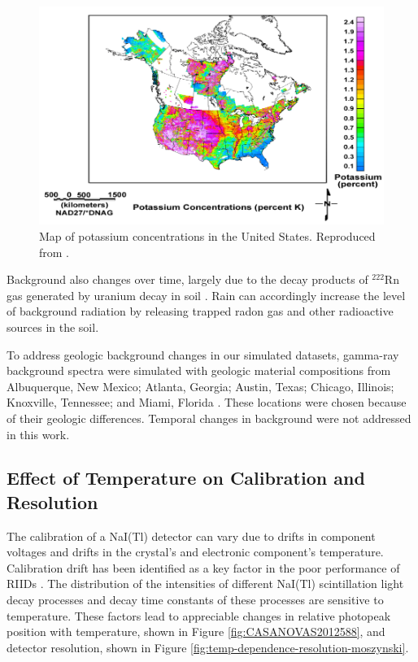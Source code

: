 \begin{figure}[H]
	\centering
	\includegraphics[trim=10 0 5 0, clip, width=1.0\linewidth]{images/USGS_k_conc}
	\caption{Map of potassium concentrations in the United States. Reproduced from \cite{USGS}.}
	\label{fig:USGS_k_conc}
\end{figure}

Background also changes over time, largely due to the decay products of $^{222}$Rn gas generated by uranium decay in soil \cite{knoll}. Rain can accordingly increase the level of background radiation by releasing trapped radon gas and other radioactive sources in the soil.

To address geologic background changes in our simulated datasets, gamma-ray background spectra were simulated with geologic material compositions from Albuquerque, New Mexico; Atlanta, Georgia; Austin, Texas; Chicago, Illinois; Knoxville, Tennessee; and Miami, Florida \cite{mitchell2014}. These locations were chosen because of their geologic differences. Temporal changes in background were not addressed in this work.



\subsection{Effect of Temperature on Calibration and Resolution}


The calibration of a NaI(Tl) detector can vary due to drifts in component voltages and drifts in the crystal's and electronic component's temperature. Calibration drift has been identified as a key factor in the poor performance of RIIDs \cite{blackadar2003}. The distribution of the intensities of different NaI(Tl) scintillation light decay processes \cite{IANAKIEV2009432} and decay time constants of these processes \cite{MOSZYNSKI2006739} are sensitive to temperature. These factors lead to appreciable changes in relative photopeak position with temperature, shown in Figure \ref{fig:CASANOVAS2012588}, and detector resolution, shown in Figure \ref{fig:temp-dependence-resolution-moszynski}. 

